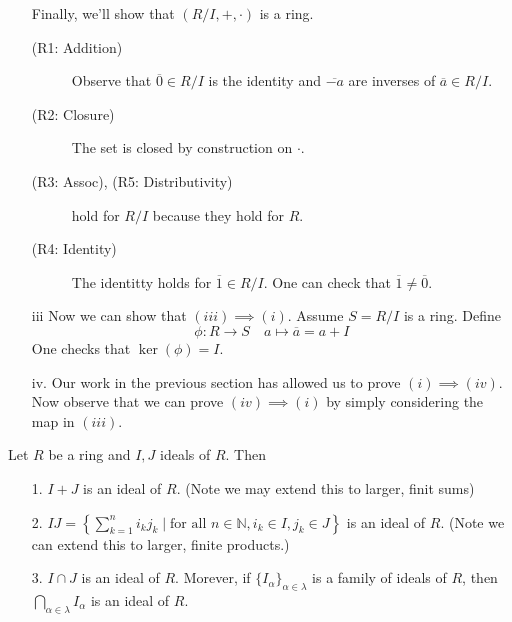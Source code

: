 \begin{prf}
\begin{itemize}
            Finally, we'll show that $(R/I, +, \cdot)$ is a ring. 
            \begin{description}
                \item[(R1: Addition)] Observe that $\overline{0}
                \in R/I$ is the identity and $\overline{-a}$ are
                inverses of $\overline{a} \in R/I$. 

                \item[(R2: Closure)] The set is closed by
                construction on $\cdot$. 

                \item[(R3: Assoc), (R5: Distributivity)] hold for
                $R/I$ because they hold for $R$. 

                \item[(R4: Identity)] The identitty holds for
                $\overline{1} \in R/I$. One can check that
                $\overline{1} \ne \overline{0}$. 
            \end{description}
            \item[iii] Now we can show that $(iii) \implies (i)$.
            Assume $S = R/I$ is a ring. Define 
            \[
                \phi: R \to S \quad a \mapsto \overline{a} = a + I
            \]
            One checks that $\ker(\phi) = I$. 

            \item[iv.] Our work in the previous section has
            allowed us to prove $(i) \implies (iv)$. Now observe
            that we can prove $(iv) \implies (i)$ by simply
            considering the map in $(iii)$.
        \end{itemize}
    \end{prf}
    

    \begin{thm}
        Let $R$ be a ring and $I, J$ ideals of $R$. Then 
        \begin{itemize}
            \item[1.] $I +J$ is an ideal of $R.$ (Note we may
            extend this to larger, finit sums)
            \item[2.] $IJ = \left\{\displaystyle \sum_{k=1}^ni_kj_k \mid \text{for all
            } n \in \mathbb{N}, i_k \in I, j_k \in J\right\}$ is an
            ideal of $R$. (Note we can extend this to larger,
            finite products.) 
            \item[3.] $I \cap J$ is an ideal of $R$. Morever, if
            $\{I_\alpha\}_{\alpha \in \lambda}$ is a family of
            ideals of $R$, then $\bigcap\limits_{\alpha \in
            \lambda} I_\alpha$ is an ideal of $R$. 
        \end{itemize}
    \end{thm}

